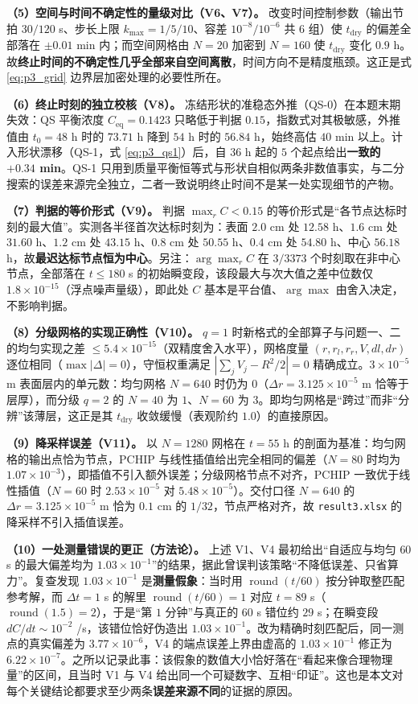 \textbf{（5）空间与时间不确定性的量级对比（V6、V7）。} 改变时间控制参数（输出节拍 $30/120$ s、步长上限 $k_{\max}=1/5/10$、容差 $10^{-8}/10^{-6}$ 共 $6$ 组）使 $t_{\text{dry}}$ 的偏差全部落在 $\pm0.01$ min 内；而空间网格由 $N=20$ 加密到 $N=160$ 使 $t_{\text{dry}}$ 变化 $0.9$ h。故\textbf{终止时间的不确定性几乎全部来自空间离散}，时间方向不是精度瓶颈。这正是式 \eqref{eq:p3_grid} 边界层加密处理的必要性所在。

\textbf{（6）终止时刻的独立校核（V8）。} 冻结形状的准稳态外推（QS-0）在本题末期失效：QS 平衡浓度 $C_{\text{eq}}=0.1423$ 只略低于判据 $0.15$，指数式对其极敏感，外推值由 $t_0=48$ h 时的 $73.71$ h 降到 $54$ h 时的 $56.84$ h，始终高估 $40$ min 以上。计入形状漂移（QS-1，式 \eqref{eq:p3_qs1}）后，自 $36$ h 起的 $5$ 个起点给出\textbf{一致的 $+0.34$ min}。QS-1 只用到质量平衡恒等式与形状自相似两条非数值事实，与二分搜索的误差来源完全独立，二者一致说明终止时间不是某一处实现细节的产物。

\textbf{（7）判据的等价形式（V9）。} 判据 $\max_rC<0.15$ 的等价形式是“各节点达标时刻的最大值”。实测各半径首次达标时刻为：表面 $2.0$ cm 处 $12.58$ h、$1.6$ cm 处 $31.60$ h、$1.2$ cm 处 $43.15$ h、$0.8$ cm 处 $50.55$ h、$0.4$ cm 处 $54.80$ h、中心 $56.18$ h，故\textbf{最迟达标节点恒为中心}。另注：$\arg\max_rC$ 在 $3/3373$ 个时刻取在非中心节点，全部落在 $t\le180$ s 的初始瞬变段，该段最大与次大值之差中位数仅 $1.8\times10^{-15}$（浮点噪声量级），即此处 $C$ 基本是平台值、$\arg\max$ 由舍入决定，不影响判据。

\textbf{（8）分级网格的实现正确性（V10）。} $q=1$ 时新格式的全部算子与问题一、二的均匀实现之差 $\le5.4\times10^{-15}$（双精度舍入水平），网格度量 $(r,r_l,r_r,V,dl,dr)$ 逐位相同（$\max|\Delta|=0$），守恒权重满足 $|\sum_jV_j-R^2/2|=0$ 精确成立。$3\times10^{-5}$ m 表面层内的单元数：均匀网格 $N=640$ 时仍为 $0$（$\Delta r=3.125\times10^{-5}$ m 恰等于层厚），而分级 $q=2$ 的 $N=40$ 为 $1$、$N=60$ 为 $3$。即均匀网格是“跨过”而非“分辨”该薄层，这正是其 $t_{\text{dry}}$ 收敛缓慢（表观阶约 $1.0$）的直接原因。

\textbf{（9）降采样误差（V11）。} 以 $N=1280$ 网格在 $t=55$ h 的剖面为基准：均匀网格的输出点恰为节点，PCHIP 与线性插值给出完全相同的偏差（$N=80$ 时均为 $1.07\times10^{-3}$），即插值不引入额外误差；分级网格节点不对齐，PCHIP 一致优于线性插值（$N=60$ 时 $2.53\times10^{-5}$ 对 $5.48\times10^{-5}$）。交付口径 $N=640$ 的 $\Delta r=3.125\times10^{-5}$ m 恰为 $0.1$ cm 的 $1/32$，节点严格对齐，故 \texttt{result3.xlsx} 的降采样不引入插值误差。

\textbf{（10）一处测量错误的更正（方法论）。} 上述 V1、V4 最初给出“自适应与均匀 $60$ s 的最大偏差均为 $1.03\times10^{-1}$”的结果，据此曾误判该策略“不降低误差、只省算力”。复查发现 $1.03\times10^{-1}$ 是\textbf{测量假象}：当时用 $\operatorname{round}(t/60)$ 按分钟取整匹配参考解，而 $\Delta t=1$ s 的解里 $\operatorname{round}(t/60)=1$ 对应 $t=89$ s（$\operatorname{round}(1.5)=2$），于是“第 $1$ 分钟”与真正的 $60$ s 错位约 $29$ s；在瞬变段 $dC/dt\sim10^{-2}$ /s，该错位恰好伪造出 $1.03\times10^{-1}$。改为精确时刻匹配后，同一测点的真实偏差为 $3.77\times10^{-6}$，V4 的端点误差上界由虚高的 $1.03\times10^{-1}$ 修正为 $6.22\times10^{-7}$。之所以记录此事：该假象的数值大小恰好落在“看起来像合理物理量”的区间，且当时 V1 与 V4 给出同一个可疑数字、互相“印证”。这也是本文对每个关键结论都要求至少两条\textbf{误差来源不同}的证据的原因。
